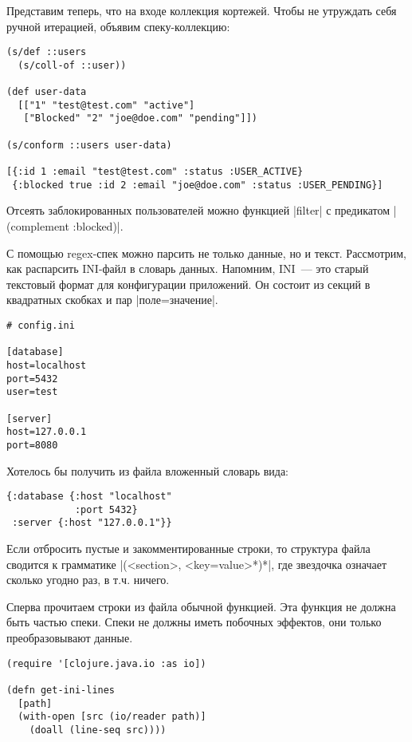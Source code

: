 Представим теперь, что на входе коллекция кортежей. Чтобы не утруждать себя
ручной итерацией, объявим спеку-коллекцию:

\begin{verbatim}
(s/def ::users
  (s/coll-of ::user))

(def user-data
  [["1" "test@test.com" "active"]
   ["Blocked" "2" "joe@doe.com" "pending"]])

(s/conform ::users user-data)

[{:id 1 :email "test@test.com" :status :USER_ACTIVE}
 {:blocked true :id 2 :email "joe@doe.com" :status :USER_PENDING}]
\end{verbatim}

Отсеять заблокированных пользователей можно функцией \spverb|filter| с предикатом
\spverb|(complement :blocked)|.

С помощью regex-спек можно парсить не только данные, но и текст. Рассмотрим, как
распарсить INI-файл в словарь данных. Напомним, INI~--- это старый текстовый
формат для конфигурации приложений. Он состоит из секций в квадратных скобках и
пар \spverb|поле=значение|.

\begin{verbatim}
# config.ini

[database]
host=localhost
port=5432
user=test

[server]
host=127.0.0.1
port=8080
\end{verbatim}

Хотелось бы получить из файла вложенный словарь вида:

\begin{verbatim}
{:database {:host "localhost"
            :port 5432}
 :server {:host "127.0.0.1"}}
\end{verbatim}

Если отбросить пустые и закомментированные строки, то структура файла сводится к
грамматике \spverb|(<section>, <key=value>*)*|, где звездочка означает сколько угодно
раз, в т.ч. ничего.

Сперва прочитаем строки из файла обычной функцией. Эта функция не должна быть
частью спеки. Спеки не должны иметь побочных эффектов, они только
преобразовывают данные.

\begin{verbatim}
(require '[clojure.java.io :as io])

(defn get-ini-lines
  [path]
  (with-open [src (io/reader path)]
    (doall (line-seq src))))
\end{verbatim}

